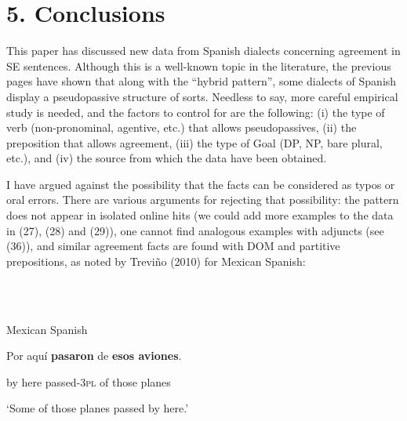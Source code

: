 \documentclass[output=paper]{langsci/langscibook}
\begin{document}
\section{ 5. Conclusions}

\begin{styleHTMLPreformatted}
This paper has discussed new data from Spanish dialects concerning agreement in SE sentences. Although this is a well-known topic in the literature, the previous pages have shown that along with the “hybrid pattern”, some dialects of Spanish display a pseudopassive structure of sorts. Needless to say, more careful empirical study is needed, and the factors to control for are the following: (i) the type of verb (non-pronominal, agentive, etc.) that allows pseudopassives, (ii) the preposition that allows agreement, (iii) the type of Goal (DP, NP, bare plural, etc.), and (iv) the source from which the data have been obtained. 
\end{styleHTMLPreformatted}

\begin{styleHTMLPreformatted}
  I have argued against the possibility that the facts can be considered as typos or oral errors. There are various arguments for rejecting that possibility: the pattern does not appear in isolated online hits (we could add more examples to the data in (27), (28) and (29)), one cannot find analogous examples with adjuncts (see (36)), and similar agreement facts are found with DOM and partitive prepositions, as noted by Treviño (2010) for Mexican Spanish:
\end{styleHTMLPreformatted}

\begin{styleHTMLPreformatted}
\ea%
    \label{ex:key:43}
    \gll\\
        \\
    \glt
    \z

            Mexican Spanish
\end{styleHTMLPreformatted}

\begin{styleHTMLPreformatted}
Por  aquí   \textbf{pasaron}      de  \textbf{esos   aviones}. 
\end{styleHTMLPreformatted}

\begin{styleHTMLPreformatted}
           by    here  passed-\textsc{3pl}  of  those  planes
\end{styleHTMLPreformatted}

\begin{styleHTMLPreformatted}
           ‘Some of those planes passed by here.’
\end{styleHTMLPreformatted}
\end{document}
